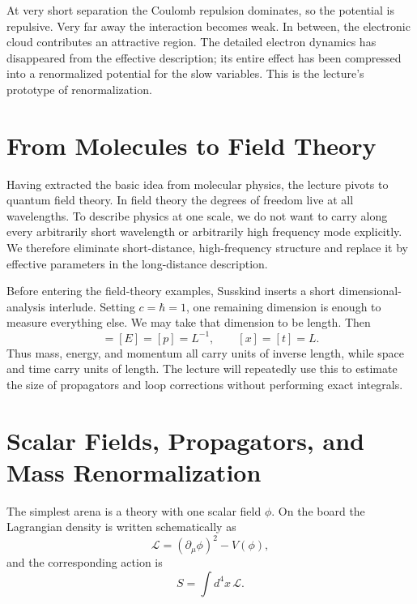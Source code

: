 At very short separation the Coulomb repulsion dominates, so the potential is repulsive. Very far away the interaction becomes weak. In between, the electronic cloud contributes an attractive region. The detailed electron dynamics has disappeared from the effective description; its entire effect has been compressed into a renormalized potential for the slow variables. This is the lecture's prototype of renormalization.

\section{From Molecules to Field Theory}

Having extracted the basic idea from molecular physics, the lecture pivots to quantum field theory. In field theory the degrees of freedom live at all wavelengths. To describe physics at one scale, we do not want to carry along every arbitrarily short wavelength or arbitrarily high frequency mode explicitly. We therefore eliminate short-distance, high-frequency structure and replace it by effective parameters in the long-distance description.

Before entering the field-theory examples, Susskind inserts a short dimensional-analysis interlude. Setting \(c=\hbar=1\), one remaining dimension is enough to measure everything else. We may take that dimension to be length. Then
\begin{equation}
[M]=[E]=[p]=L^{-1},
\qquad
[x]=[t]=L.
\end{equation}
Thus mass, energy, and momentum all carry units of inverse length, while space and time carry units of length. The lecture will repeatedly use this to estimate the size of propagators and loop corrections without performing exact integrals.

\section{Scalar Fields, Propagators, and Mass Renormalization}

The simplest arena is a theory with one scalar field \(\phi\). On the board the Lagrangian density is written schematically as
\begin{equation}
\mathcal{L}=(\partial_\mu\phi)^2-V(\phi),
\end{equation}
and the corresponding action is
\begin{equation}
S=\int d^4x\,\mathcal{L}.
\end{equation}

